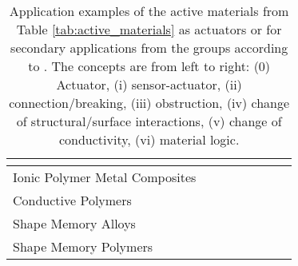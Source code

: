 \documentclass{article}
\begin{document}
\begin{landscape}
\begin{table}[htbp]
\begin{tabular}{|p{3.5cm}|p{1.7cm}|p{1.7cm}|p{1.7cm}|p{1.7cm}|p{1.7cm}|p{1.9cm}|p{1.7cm}|}
			& \cite{Walker2017}
			& 
			& \cite{Giousouf2013} %
			& \cite{Lee2014,Matysek2009,Ashby2022a,Henke2012}
			& \cite{O’Brien2010,Chau2016,Shian2013}
			&  \cite{Henke2017,Hajiesmaili2022}
			\\
			\hline
			Ionic Polymer Metal Composites 		
			& \cite{NematNasser2001,Yamakita2006,Kamamichi2006}
			& \cite{Wang2024c,Punning2007}
			& 
			&  \cite{Yun2011}
			&  \cite{Low2024,Yun2009}
			&  \cite{Lee2008}
			&  \cite{Wang2022a}
			\\
			\hline
			Conductive Polymers		
			& \cite{Baughman1996,Madden2002,Smela1993,Otero1998,Das2012,Wu2005}
			& 
			& 
			&  
			&  
			&  
			&  
			\\
			\hline
			Shape Memory Alloys		
			& \cite{Sofla2008,Benard1998,Kumar2020}
			& \cite{Furst2013} 
			& 
			&  \cite{Megnin2013}
			&  \cite{Manzo2005,Hartl2007,Calkins2010} %
			&  \cite{Hasan2016,Sutapun1998,TabibAzar1999}
			&  
			\\
			\hline
			Shape Memory Polymers 		
			& \cite{Behl2013,Xing2020,Song2015}
			& 
			& 
			&  
			&  \cite{Lin2006,Gandhi2007,McKnight2005}  %
			&  \cite{Wang2022,Wischke2010}
			&  
			\\
			\hline
		\end{tabular}
		\caption{Application examples of the active materials from Table \ref{tab:active_materials} as actuators or for secondary applications from the groups according to \cite{Ehrenhofer2025shapes_review}. The concepts are from left to right: (0) Actuator, (i) sensor-actuator, (ii) connection/breaking, (iii) obstruction, (iv) change of structural/surface interactions, (v) change of conductivity, (vi) material logic.}
		\label{tab:active_applications}
	\end{table}
\end{landscape}



	
	
\end{document}
